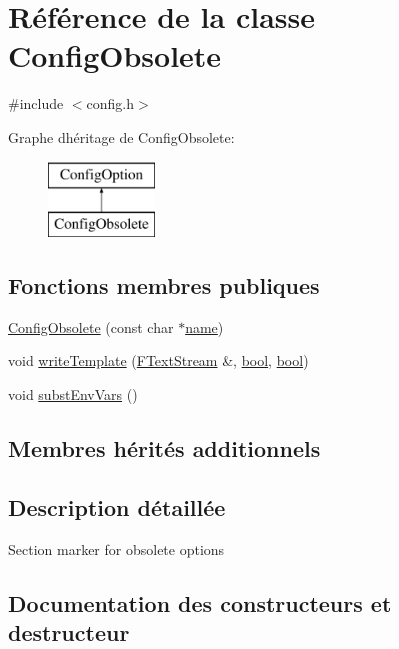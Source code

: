 \hypertarget{class_config_obsolete}{}\section{Référence de la classe Config\+Obsolete}
\label{class_config_obsolete}


{\ttfamily \#include $<$config.\+h$>$}

Graphe d\textquotesingle{}héritage de Config\+Obsolete\+:\begin{figure}[H]
\begin{center}
\leavevmode
\includegraphics[height=2.000000cm]{class_config_obsolete}
\end{center}
\end{figure}
\subsection*{Fonctions membres publiques}
\begin{DoxyCompactItemize}
\item 
\hyperlink{class_config_obsolete_a3c26753a119a658ca27fdb594fa19ba7}{Config\+Obsolete} (const char $\ast$\hyperlink{class_config_option_a2f226c32b0c447c1fa628660f42859c4}{name})
\item 
void \hyperlink{class_config_obsolete_a00e20cabc9f351c44d6a76c924903356}{write\+Template} (\hyperlink{class_f_text_stream}{F\+Text\+Stream} \&, \hyperlink{qglobal_8h_a1062901a7428fdd9c7f180f5e01ea056}{bool}, \hyperlink{qglobal_8h_a1062901a7428fdd9c7f180f5e01ea056}{bool})
\item 
void \hyperlink{class_config_obsolete_ad301e76c69eb68f61604856fa4180865}{subst\+Env\+Vars} ()
\end{DoxyCompactItemize}
\subsection*{Membres hérités additionnels}


\subsection{Description détaillée}
Section marker for obsolete options 

\subsection{Documentation des constructeurs et destructeur}
\hypertarget{class_config_obsolete_a3c26753a119a658ca27fdb594fa19ba7}{}
